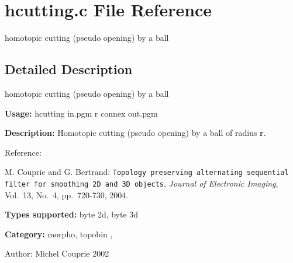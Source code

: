\section{hcutting.c File Reference}
\label{hcutting_8c}
homotopic cutting (pseudo opening) by a ball 



\subsection{Detailed Description}
homotopic cutting (pseudo opening) by a ball 

{\bf Usage:} hcutting in.pgm r connex out.pgm

{\bf Description:} Homotopic cutting (pseudo opening) by a ball of radius {\bf r}.

Reference:\par
 [CB04] M. Couprie and G. Bertrand: {\tt Topology preserving alternating sequential filter for smoothing 2D and 3D objects}, {\em  Journal of Electronic Imaging\/}, Vol.~13, No.~4, pp.~720-730, 2004.

{\bf Types supported:} byte 2d, byte 3d

{\bf Category:} morpho, topobin ,

\begin{Desc}
\item[Author:]Michel Couprie 2002 \end{Desc}
